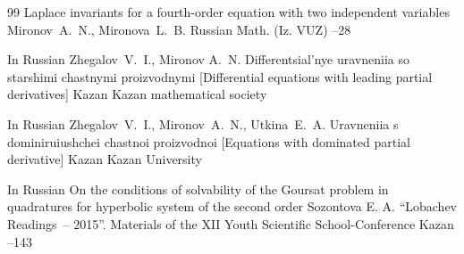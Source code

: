 \begin{thebibliography}{99}
\paper Laplace invariants for a fourth-order equation with two independent variables
\by  Mironov~A.~N., Mironova~L.~B.
\jour Russian Math. (Iz. VUZ)
--28


\lang In Russian
\by Zhegalov~V.~I., Mironov A.~N.
\book Differentsial'nye uravneniia so starshimi chastnymi proizvodnymi \rm [Differential equations with leading partial derivatives]
\publaddr Kazan
\publ Kazan mathematical society



\lang In Russian
\by Zhegalov~V.~I., Mironov~A.~N., Utkina~E.~A.
\book Uravneniia s dominiruiushchei chastnoi proizvodnoi \rm [Equations with  dominated partial derivative]
\publaddr Kazan
\publ Kazan University


\lang In Russian 
\paper On the conditions of solvability of the Goursat problem in quadratures for hyperbolic system of the second order
\by  Sozontova E. A.
\inbook ``Lobachev Readings~-- 2015''. Materials of the XII Youth Scientific School-Conference
\publaddr Kazan
--143


\end{thebibliography}

\renewcommand{\baselinestretch}{0.9}

\newpage

%
